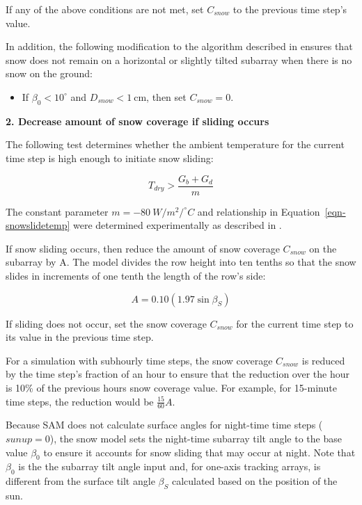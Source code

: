 \documentclass[12pt,letterpaper]{article}
\begin{document}
If any of the above conditions are not met, set $C_{snow}$ to the previous time step's value.

In addition, the following modification to the algorithm described in \citet{marion-snowmodel} ensures that snow does not remain on a horizontal or slightly tilted subarray when there is no snow on the ground: 

\begin{itemize}
\item If $\beta_0<10^\circ$ and $D_{snow} < 1~\text{cm}$, then set $C_{snow}=0$.
\end{itemize}

\textbf{2. Decrease amount of snow coverage if sliding occurs}

The following test determines whether the ambient temperature for the current time step is high enough to initiate snow sliding:

\begin{equation}\label{eqn-snowslidetemp}
T_{dry}> \frac{G_{b}+G_{d}}{m}
\end{equation}

The constant parameter $m=-80\ W/m^2/^\circ C$ and relationship in Equation~\ref{eqn-snowslidetemp} were determined experimentally as described in \citet{marion-snowmodel}.

If snow sliding occurs, then reduce the amount of snow coverage $C_{snow}$ on the subarray by A. The model divides the row height into ten tenths so that the snow slides in increments of one tenth the length of the row's side:

\begin{equation}	\label{eqn-snowSlideAmount}
	A = 0.10 \left(1.97  \sin \beta_{S} \right)
\end{equation}

If sliding does not occur, set the snow coverage $C_{snow}$ for the current time step to its value in the previous time step. 

For a simulation with subhourly time steps, the snow coverage $C_{snow}$ is reduced by the time step's fraction of an hour to ensure that the reduction over the hour is 10\% of the previous hours snow coverage value. For example, for 15-minute time steps, the reduction would be $\frac{15}{60}A$.

Because SAM does not calculate surface angles for night-time time steps ($sunup = 0$), the snow model sets the night-time subarray tilt angle to the base value $\beta_0$ to ensure it accounts for snow sliding that may occur at night. Note that $\beta_0$ is the the subarray tilt angle input and, for one-axis tracking arrays, is different from the surface tilt angle $\beta_S$ calculated based on the position of the sun.
\end{document}
